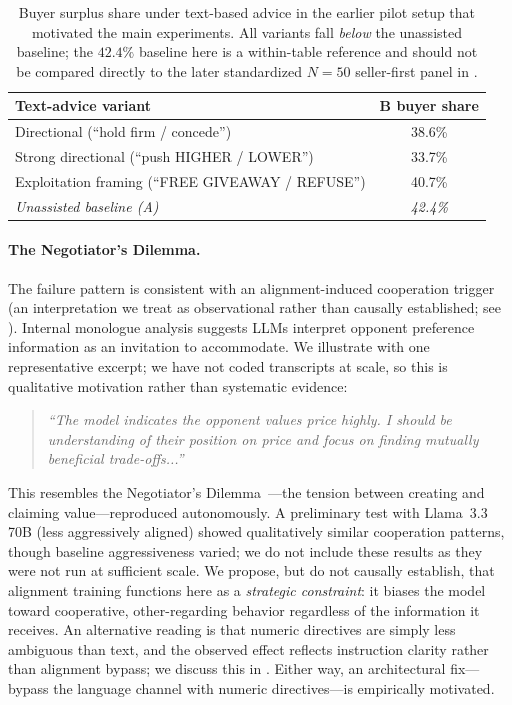 \documentclass[11pt,a4paper]{article}
\begin{document}
\begin{table}[h]
\centering
\caption{Buyer surplus share under text-based advice in the earlier pilot setup that motivated the main experiments. All variants fall \emph{below} the unassisted baseline; the $42.4\%$ baseline here is a within-table reference and should not be compared directly to the later standardized $N\!=\!50$ seller-first panel in .}
\label{tab:text_fail}
\begin{tabular}{lc}
\toprule
Text-advice variant & B buyer share \\
\midrule
Directional (``hold firm / concede'') & 38.6\% \\
Strong directional (``push HIGHER / LOWER'') & 33.7\% \\
Exploitation framing (``FREE GIVEAWAY / REFUSE'') & 40.7\% \\
\midrule
\emph{Unassisted baseline (A)} & \emph{42.4\%} \\
\bottomrule
\end{tabular}
\end{table}

\paragraph{The Negotiator's Dilemma.}
\label{sec:dilemma}
The failure pattern is consistent with an alignment-induced cooperation trigger (an interpretation we treat as observational rather than causally established; see ). Internal monologue analysis suggests LLMs interpret opponent preference information as an invitation to accommodate. We illustrate with one representative excerpt; we have not coded transcripts at scale, so this is qualitative motivation rather than systematic evidence:

\begin{quote}
\small
\emph{``The model indicates the opponent values price highly. I should be understanding of their position on price and focus on finding mutually beneficial trade-offs...''}
\end{quote}

This resembles the Negotiator's Dilemma~\citep{lax1986manager}---the tension between creating and claiming value---reproduced autonomously. A preliminary test with Llama~3.3 70B (less aggressively aligned) showed qualitatively similar cooperation patterns, though baseline aggressiveness varied; we do not include these results as they were not run at sufficient scale. We propose, but do not causally establish, that alignment training functions here as a \emph{strategic constraint}: it biases the model toward cooperative, other-regarding behavior regardless of the information it receives. An alternative reading is that numeric directives are simply less ambiguous than text, and the observed effect reflects instruction clarity rather than alignment bypass; we discuss this in . Either way, an architectural fix---bypass the language channel with numeric directives---is empirically motivated.
\end{document}
